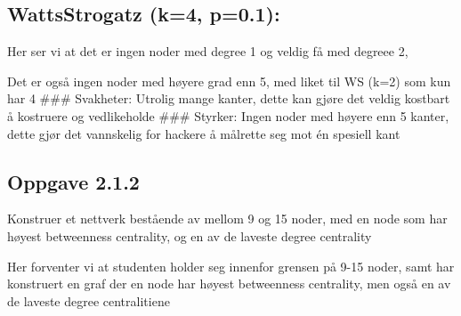 \documentclass[11pt]{article}
\begin{document}
\hypertarget{wattsstrogatz-k4-p0.1}{%
\subsection*{WattsStrogatz (k=4, p=0.1):}\label{wattsstrogatz-k4-p0.1}}

Her ser vi at det er ingen noder med degree 1 og veldig få med degreee
2,

Det er også ingen noder med høyere grad enn 5, med liket til WS (k=2)
som kun har 4 \#\#\# Svakheter: Utrolig mange kanter, dette kan gjøre
det veldig kostbart å kostruere og vedlikeholde \#\#\# Styrker: Ingen
noder med høyere enn 5 kanter, dette gjør det vannskelig for hackere å
målrette seg mot én spesiell kant

    \hypertarget{oppgave-2.1.2}{%
\subsection*{Oppgave 2.1.2}\label{oppgave-2.1.2}}

Konstruer et nettverk bestående av mellom 9 og 15 noder, med en node som
har høyest betweenness centrality, og en av de laveste degree centrality

Her forventer vi at studenten holder seg innenfor grensen på 9-15 noder,
samt har konstruert en graf der en node har høyest betweenness
centrality, men også en av de laveste degree centralitiene
\end{document}
